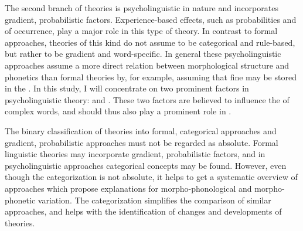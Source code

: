 
The second branch of theories is psycholinguistic in nature and incorporates gradient, probabilistic factors. Experience-based effects, such as probabilities and  of occurrence, play a major role in this type of theory. In contrast to formal approaches, theories of this kind do not assume  to be categorical and rule-based, but rather to be gradient and word-specific. In  general these psycholinguistic approaches assume a more direct relation between morphological structure and phonetics than formal theories by, for example, assuming that fine  may be stored in the . In this study, I will concentrate on two prominent factors in psycholinguistic theory:  and . These two factors are believed to influence the  of complex words, and should thus also play a prominent role in . 


The binary classification of theories into formal, categorical approaches and gradient, probabilistic approaches must not be regarded as absolute. Formal linguistic theories may incorporate gradient, probabilistic factors, and in psycholinguistic approaches categorical concepts may be found. However, even though the categorization is not absolute, it helps to get a systematic overview of approaches which propose explanations for morpho-phonological and morpho-phonetic variation. The categorization simplifies the comparison of similar approaches, and helps with the identification of changes and developments of theories.

